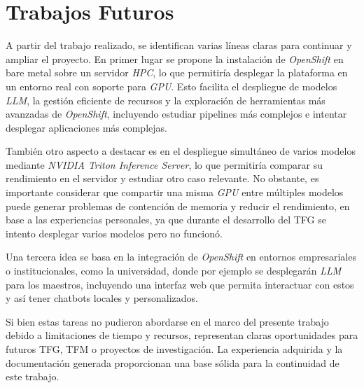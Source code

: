 \section{Trabajos Futuros}
A partir del trabajo realizado, se identifican varias líneas claras para continuar y ampliar el proyecto. En primer lugar se propone la instalación de \textit{OpenShift} en bare metal sobre un servidor \textit{HPC}, lo que permitiría desplegar la plataforma en un entorno real con soporte para \textit{GPU}. Esto facilita el despliegue de modelos \textit{LLM}, la gestión eficiente de recursos y la exploración de herramientas más avanzadas de \textit{OpenShift}, incluyendo estudiar pipelines más complejos e intentar desplegar aplicaciones más complejas.

También otro aspecto a destacar es en el despliegue simultáneo de varios modelos mediante \textit{NVIDIA Triton Inference Server}, lo que permitiría comparar su rendimiento en el servidor y estudiar otro caso relevante. No obstante, es importante considerar que compartir una misma \textit{GPU} entre múltiples modelos puede generar problemas de contención de memoria y reducir el rendimiento, en base a las experiencias personales, ya que durante el desarrollo del TFG se intento desplegar varios modelos pero no funcionó.

Una tercera idea se basa en la integración de \textit{OpenShift} en entornos empresariales o institucionales, como la universidad, donde por ejemplo se desplegarán \textit{LLM} para los maestros, incluyendo una interfaz web que permita interactuar con estos y así tener chatbots locales y personalizados.

Si bien estas tareas no pudieron abordarse en el marco del presente trabajo debido a limitaciones de tiempo y recursos, representan claras oportunidades para futuros TFG, TFM o proyectos de investigación. La experiencia adquirida y la documentación generada proporcionan una base sólida para la continuidad de este trabajo.

